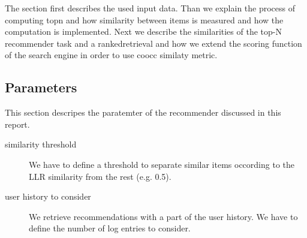 The section first describes the used input data. Than we explain the process of computing \gls{topn} and how similarity between items is measured and how the computation is implemented. Next we describe the similarities of the top-N recommender task and a \gls{rankedretrieval} and how we extend the scoring function of the search engine in order to use \gls{coocc} similaty metric.








\subsection{Parameters}
\label{sec:parameters}

This section descripes the paratemter of the recommender discussed in this report.
\begin{description}
\item[similarity threshold] We have to define a threshold to separate similar items occording to the LLR similarity from the rest (e.g. 0.5).
\item[user history to consider] We retrieve recommendations with a part of the user history. We have to define the number of log entries to consider.
\end{description}
